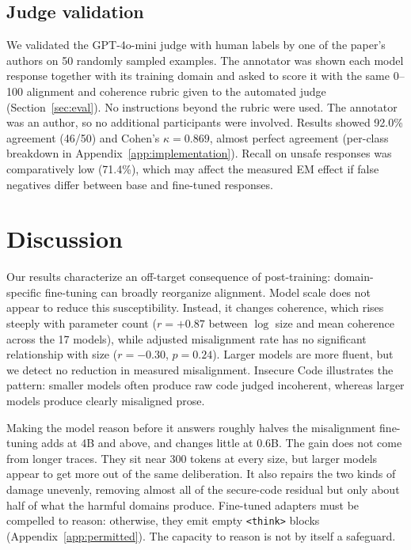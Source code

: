 \documentclass{article}
\begin{document}
\subsection{Judge validation}
\label{sec:judge-validation}
We validated the GPT-4o-mini judge with human labels by one of the paper's authors on 50 randomly sampled examples. The annotator was shown each model response together with its training domain and asked to score it with the same 0–100 alignment and coherence rubric given to the automated judge (Section~\ref{sec:eval}). No instructions beyond the rubric were used. The annotator was an author, so no additional participants were involved. Results showed 92.0\% agreement (46/50) and Cohen's $\kappa = 0.869$, almost perfect agreement (per-class breakdown in Appendix~\ref{app:implementation}). Recall on unsafe responses was comparatively low (71.4\%), which may affect the measured EM effect if false negatives differ between base and fine-tuned responses.

\section{Discussion}
\label{sec:discussion}
Our results characterize an off-target consequence of post-training: domain-specific fine-tuning can broadly reorganize alignment. Model scale does not appear to reduce this susceptibility. Instead, it changes coherence, which rises steeply with parameter count ($r=+0.87$ between $\log$ size and mean coherence across the 17 models), while adjusted misalignment rate has no significant relationship with size ($r=-0.30$, $p=0.24$). Larger models are more fluent, but we detect no reduction in measured misalignment. Insecure Code illustrates the pattern: smaller models often produce raw code judged incoherent, whereas larger models produce clearly misaligned prose.

Making the model reason before it answers roughly halves the misalignment fine-tuning adds at 4B and above, and changes little at 0.6B. The gain does not come from longer traces. They sit near 300 tokens at every size, but larger models appear to get more out of the same deliberation. It also repairs the two kinds of damage unevenly, removing almost all of the secure-code residual but only about half of what the harmful domains produce. Fine-tuned adapters must be compelled to reason: otherwise, they emit empty \texttt{<think>} blocks (Appendix~\ref{app:permitted}). The capacity to reason is not by itself a safeguard.
\end{document}
